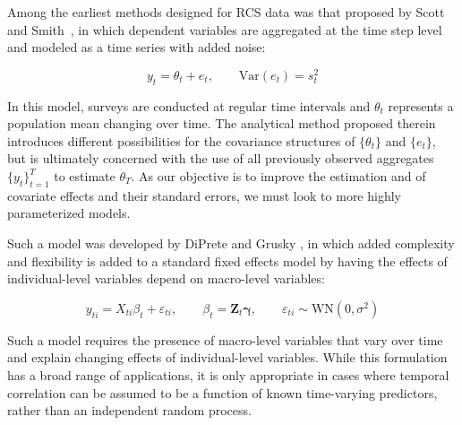 



Among the earliest methods designed for RCS data was that proposed by Scott and Smith~\cite{scott1974repeatedsurveys}, in which dependent variables are aggregated at the time step level and modeled as a time series with added noise:


\begin{equation}
    \label{eq:scott}
    y_t = \theta_t + e_t, \qquad \text{Var}(e_t) = s_t^2
\end{equation}

In this model, surveys are conducted at regular time intervals and $\theta_t$ represents a population mean changing over time. The analytical method proposed therein introduces different possibilities for the covariance structures of $\{\theta_t\}$ and $\{e_t\}$, but is ultimately concerned with the use of all previously observed aggregates $\{y_t\}_{t=1}^T$ to estimate $\theta_T$. As our objective is to improve the estimation and of covariate effects and their standard errors, we must look to more highly parameterized models.

Such a model was developed by DiPrete and Grusky \cite{diprete1990multilevel}, in which added complexity and flexibility is added to a standard fixed effects model by having the effects of individual-level variables depend on macro-level variables:

\begin{equation}
    \label{eq:diprete}
    y_{ti} = X_{ti}\beta_t + \varepsilon_{ti}, \qquad \beta_t = \mathbf{Z}_t \mathbf{\gamma}, \qquad \varepsilon_{ti} \sim \text{WN}(0,\sigma^2)
\end{equation}

Such a model requires the presence of macro-level variables that vary over time and explain changing effects of individual-level variables. While this formulation has a broad range of applications, it is only appropriate in cases where temporal correlation can be assumed to be a function of known time-varying predictors, rather than an independent random process.
